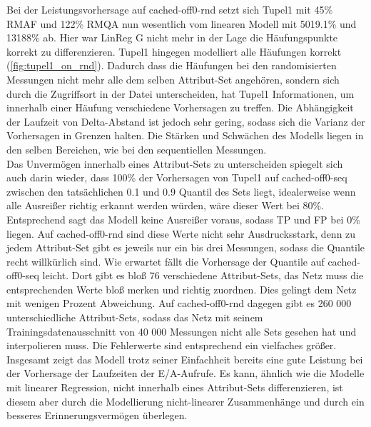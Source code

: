 \documentclass[
	12pt,
	a4paper,
	BCOR10mm,
	DIV14,
	listof=totoc,
	bibliography=totoc,
	headsepline
]{scrreprt}
\begin{document}
Bei der Leistungsvorhersage auf cached-off0-rnd setzt sich Tupel1 mit 45\% RMAF und 122\% RMQA nun wesentlich vom linearen Modell mit 5019.1\% und 13188\% ab. Hier war LinReg G nicht mehr in der Lage die Häufungspunkte korrekt zu differenzieren. Tupel1 hingegen modelliert alle Häufungen korrekt (\ref{fig:tupel1_on_rnd}). Dadurch dass die Häufungen bei den randomisierten Messungen nicht mehr alle dem selben Attribut-Set angehören, sondern sich durch die Zugriffsort in der Datei unterscheiden, hat Tupel1 Informationen, um innerhalb einer Häufung verschiedene Vorhersagen zu treffen. Die Abhängigkeit der Laufzeit von Delta-Abstand ist jedoch sehr gering, sodass sich die Varianz der Vorhersagen in Grenzen halten. Die Stärken und Schwächen des Modells liegen
in den selben Bereichen, wie bei den sequentiellen Messungen.\\
Das Unvermögen innerhalb eines Attribut-Sets zu unterscheiden spiegelt sich auch darin wieder, dass 100\% der Vorhersagen von Tupel1 auf cached-off0-seq zwischen den tatsächlichen 0.1 und 0.9 Quantil des Sets liegt, idealerweise wenn alle Ausreißer richtig erkannt werden würden, wäre dieser Wert bei 80\%. Entsprechend sagt das Modell keine Ausreißer voraus, sodass TP und FP bei 0\% liegen. Auf cached-off0-rnd sind diese Werte nicht sehr Ausdrucksstark, denn zu jedem Attribut-Set gibt es jeweils nur ein bis drei Messungen, sodass die Quantile recht willkürlich sind.
Wie erwartet fällt die Vorhersage der Quantile auf cached-off0-seq leicht. Dort gibt es bloß 76 verschiedene Attribut-Sets, das Netz muss die entsprechenden Werte bloß \glqq merken\grqq{} und richtig zuordnen. Dies gelingt dem Netz mit wenigen Prozent Abweichung. 
Auf cached-off0-rnd dagegen gibt es 260 000 unterschiedliche Attribut-Sets, sodass das Netz mit seinem Trainingsdatenausschnitt von 40 000 Messungen nicht alle Sets gesehen hat und interpolieren muss. Die Fehlerwerte sind entsprechend ein vielfaches größer.\\
Insgesamt zeigt das Modell trotz seiner Einfachheit bereits eine gute Leistung bei der Vorhersage der Laufzeiten der E/A-Aufrufe. Es kann, ähnlich wie die Modelle mit linearer Regression, nicht innerhalb eines Attribut-Sets differenzieren, ist diesem aber durch die Modellierung nicht-linearer Zusammenhänge und durch ein besseres \glqq Erinnerungsvermögen\grqq{} überlegen. 
\end{document}
